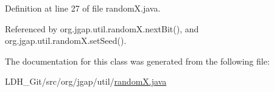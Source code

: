 Definition at line 27 of file random\-X.\-java.



Referenced by org.\-jgap.\-util.\-random\-X.\-next\-Bit(), and org.\-jgap.\-util.\-random\-X.\-set\-Seed().



The documentation for this class was generated from the following file\-:\begin{DoxyCompactItemize}
\item 
L\-D\-H\-\_\-\-Git/src/org/jgap/util/\hyperlink{random_x_8java}{random\-X.\-java}\end{DoxyCompactItemize}
